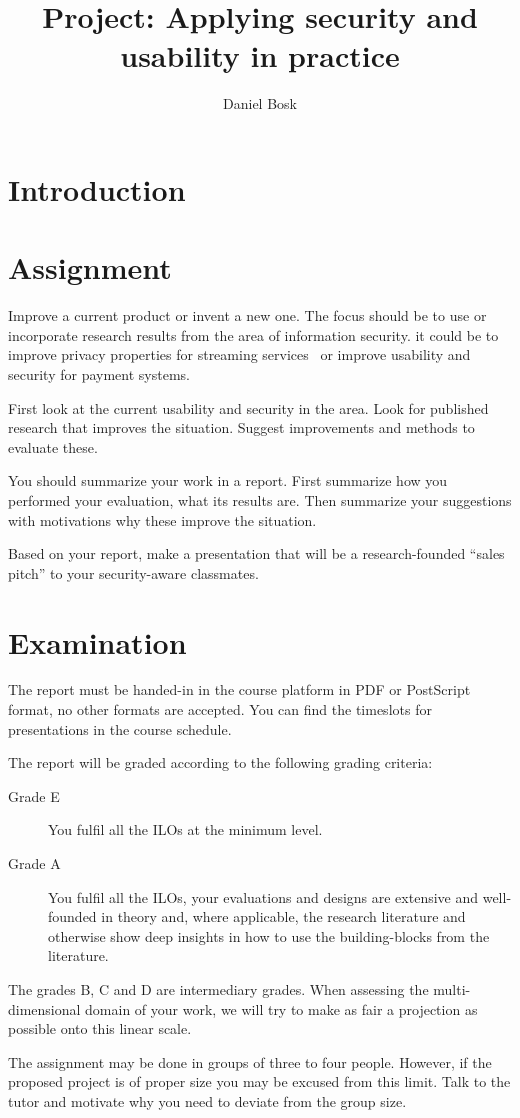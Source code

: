 \title{Project: Applying security and usability in practice}
\author{Daniel Bosk}

\maketitle

\mode*

%  

\section{Introduction}%
\label{sec:intro}




\section{Assignment}%
\label{sec:work}

Improve a current product or invent a new one.
The focus should be to use or incorporate research results from the area of 
information security.
\Eg it could be to improve privacy properties for streaming 
services~\cite[\eg][]{anonpass} or
improve usability and security for payment systems.

First look at the current usability and security in the area.
Look for published research that improves the situation.
Suggest improvements and methods to evaluate these.

You should summarize your work in a report.
First summarize how you performed your evaluation, what its results are.
Then summarize your suggestions with motivations why these improve the 
situation.

Based on your report, make a presentation that will be a research-founded 
\enquote{sales pitch} to your security-aware classmates.


\section{Examination}%
\label{sec:exam}

The report must be handed-in in the course platform in PDF or PostScript 
format, no other formats are accepted.
You can find the timeslots for presentations in the course schedule.

The report will be graded according to the following grading criteria:
\begin{description}
  \item[Grade E] You fulfil all the \acp{ILO} at the minimum level.
  \item[Grade A] You fulfil all the \acp{ILO},
    your evaluations and designs are extensive and well-founded in theory and, 
    where applicable, the research literature and otherwise show deep insights 
    in how to use the building-blocks from the literature.
\end{description}
The grades B, C and D are intermediary grades.
When assessing the multi-dimensional domain of your work, we will try to make 
as fair a projection as possible onto this linear scale.

The assignment may be done in groups of three to four people.
However, if the proposed project is of proper size you may be excused from this 
limit.
Talk to the tutor and motivate why you need to deviate from the group size.

\printbibliography
